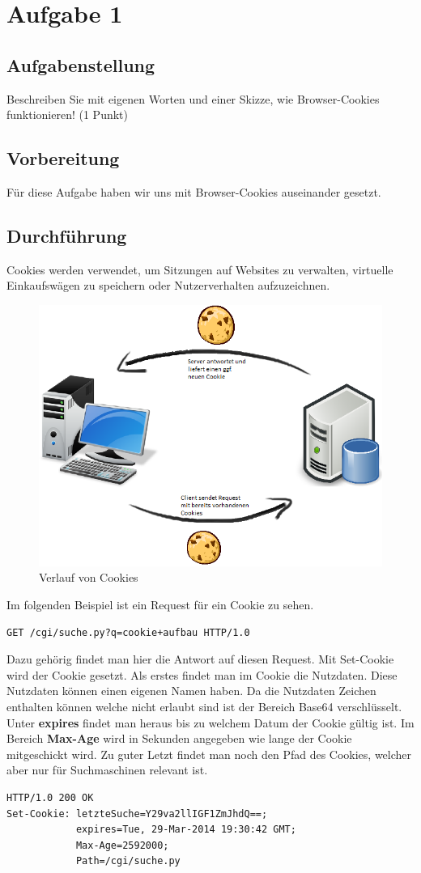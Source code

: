 \newpage

\section{Aufgabe 1}

\subsection{Aufgabenstellung}
Beschreiben Sie mit eigenen Worten und einer Skizze, wie Browser-Cookies funktionieren!
(1 Punkt)

\subsection{Vorbereitung}
Für diese Aufgabe haben wir uns mit Browser-Cookies auseinander gesetzt.

\subsection{Durchführung}
Cookies werden verwendet, um Sitzungen auf Websites zu verwalten, virtuelle Einkaufswägen zu speichern oder Nutzerverhalten aufzuzeichnen.

\begin{figure}[H]
	\centering
	\includegraphics[width=0.6 \linewidth]{images/cookies}
	\caption{Verlauf von Cookies} \label{ordner}
\end{figure} 

Im folgenden Beispiel ist ein Request für ein Cookie zu sehen.
\begin{lstlisting}
GET /cgi/suche.py?q=cookie+aufbau HTTP/1.0
\end{lstlisting}

Dazu gehörig findet man hier die Antwort auf diesen Request. Mit Set-Cookie wird der Cookie gesetzt. Als erstes findet man im Cookie die Nutzdaten. Diese Nutzdaten können einen eigenen Namen haben. Da die Nutzdaten Zeichen enthalten können welche nicht erlaubt sind ist der Bereich Base64 verschlüsselt. Unter \textbf{expires} findet man heraus bis zu welchem Datum der Cookie gültig ist. Im Bereich \textbf{Max-Age} wird in Sekunden angegeben wie lange der Cookie mitgeschickt wird. Zu guter Letzt findet man noch den Pfad des Cookies, welcher aber nur für Suchmaschinen relevant ist.
\begin{lstlisting}
HTTP/1.0 200 OK
Set-Cookie: letzteSuche=Y29va2llIGF1ZmJhdQ==;
			expires=Tue, 29-Mar-2014 19:30:42 GMT;
			Max-Age=2592000;
			Path=/cgi/suche.py
\end{lstlisting}


